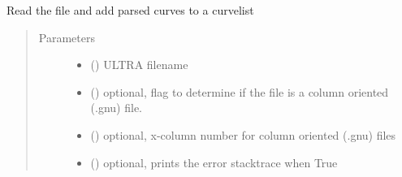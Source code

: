 \documentclass[letterpaper,10pt,english]{sphinxmanual}
\begin{document}
\begin{fulllineitems}
\label{\detokenize{pydv:pydvpy.read}}
Read the file and add parsed curves to a curvelist

\begin{sphinxVerbatim}[commandchars=\\\{\}]
  
\end{sphinxVerbatim}

\begin{sphinxVerbatim}[commandchars=\\\{\}]
       
\end{sphinxVerbatim}
\begin{quote}\begin{description}
\item[{Parameters}] \leavevmode\begin{itemize}
\item {} 
 () \textendash{} ULTRA filename

\item {} 
 () \textendash{} optional, flag to determine if the file is a column oriented (.gnu) file.

\item {} 
 () \textendash{} optional, x-column number for column oriented (.gnu) files

\item {} 
 () \textendash{} optional, prints the error stacktrace when True


\end{itemize}
\end{description}
\end{quote}
\end{fulllineitems}
\end{document}
